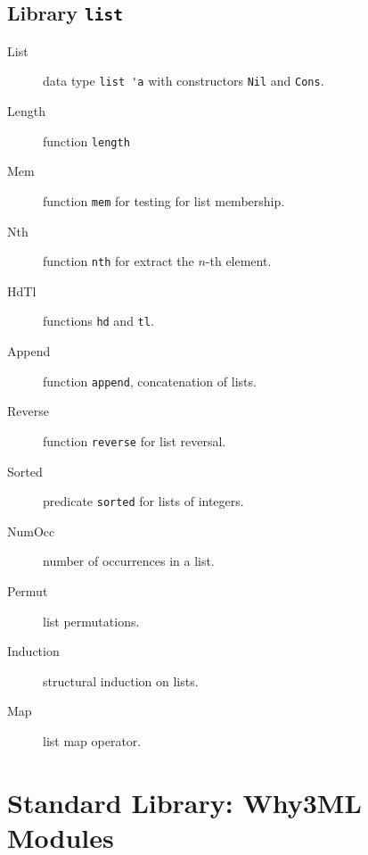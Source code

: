 \section{Library \texttt{list}}

\begin{description}
\item[List] data type \verb|list 'a| with constructors \verb|Nil| and
  \verb|Cons|.
\item[Length] function \verb|length|
\item[Mem] function \verb|mem| for testing for list membership.
\item[Nth] function \verb|nth| for extract the $n$-th element.
\item[HdTl] functions \verb|hd| and \verb|tl|.
\item[Append] function \verb|append|, concatenation of lists.
\item[Reverse] function \verb|reverse| for list reversal.
\item[Sorted] predicate \verb|sorted| for lists of integers.
\item[NumOcc] number of occurrences in a list.
\item[Permut] list permutations.
\item[Induction] structural induction on lists.
\item[Map] list map operator.
\end{description}


\chapter{Standard Library: Why3ML Modules}
\label{chap:mllibrary}



